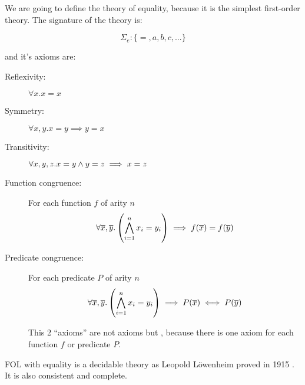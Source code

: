 \begin{example}

\label{theory:equality}

We are going to define the theory of equality, because it is the simplest first-order theory.
%
The signature of the theory is:

\[\Sigma_e:\{=,a,b,c,...\}\]

and it's axioms are:

\begin{description}
	\item[Reflexivity:	] $\forall x. x=x$
	\item[Symmetry:	] $\forall x,y. x=y \implies y=x$
	\item[Transitivity:	] $\forall x,y,z. x=y \wedge y=z \implies x=z$
	\item[Function congruence:] For each function $f$ of arity $n$
	\[\forall \overline{x},\overline{y}. \left( \bigwedge_{i=1}^n x_i = y_i \right) \implies f(\overline{x}) = f(\overline{y})\]
	\item[Predicate congruence:]  For each predicate $P$ of arity $n$
	\[\forall \overline{x},\overline{y}. \left( \bigwedge_{i=1}^n x_i = y_i \right) \implies P(\overline{x}) \iff P(\overline{y})\]

	This 2 ``axioms'' are not axioms but , because there is one axiom for each function $f$ or predicate $P$.
\end{description}

\gls{FOL} with equality is a decidable theory as Leopold Löwenheim proved in 1915 \cite{EqualityIsDecidable}. 
%
It is also consistent and complete.
\end{example}

